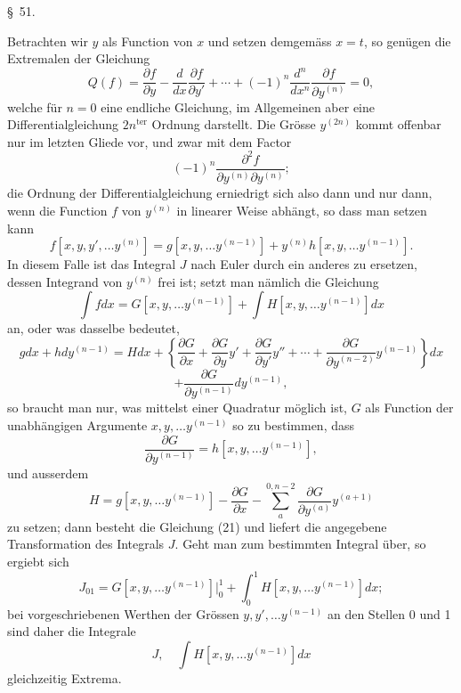 \documentclass[11pt,a4paper,leqno]{article}
\begin{document}
\begin{center}
{\large \S~51.}
\end{center}

Betrachten wir $y$ als Function von $x$ und setzen demgemäss $x=t$, so genügen die Extremalen der Gleichung
\begin{equation}\tag{20}
Q(f)=\frac{\partial f}{\partial y}-\frac{d}{dx}\frac{\partial f}{\partial y'}+\cdots+(-1)^n\frac{d^n}{dx^n}\frac{\partial f}{\partial y^{(n)}}=0,
\end{equation}
welche für $n=0$ eine endliche Gleichung, im Allgemeinen aber eine Differentialgleichung $2n^{\mathrm{ter}}$ Ordnung darstellt. Die Grösse $y^{(2n)}$ kommt offenbar nur im letzten Gliede vor, und zwar mit dem Factor
\[
(-1)^n\frac{\partial^2f}{\partial y^{(n)}\partial y^{(n)}};
\]
die Ordnung der Differentialgleichung erniedrigt sich also dann und nur dann, wenn die Function $f$ von $y^{(n)}$ in linearer Weise abhängt, so dass man setzen kann
\[
f[x,y,y',\ldots y^{(n)}]=g[x,y,\ldots y^{(n-1)}]+y^{(n)}h[x,y,\ldots y^{(n-1)}].
\]
In diesem Falle ist das Integral $J$ nach Euler durch ein anderes zu ersetzen, dessen Integrand von $y^{(n)}$ frei ist; setzt man nämlich die Gleichung
\begin{equation}\tag{21}
\int fdx=G[x,y,\ldots y^{(n-1)}]+\int H[x,y,\ldots y^{(n-1)}]dx
\end{equation}
an, oder was dasselbe bedeutet,
\[
gdx+hdy^{(n-1)}=Hdx
+\left\{\frac{\partial G}{\partial x}+\frac{\partial G}{\partial y}y'+\frac{\partial G}{\partial y'}y''+\cdots+\frac{\partial G}{\partial y^{(n-2)}}y^{(n-1)}\right\}dx
\]
\[
+\frac{\partial G}{\partial y^{(n-1)}}dy^{(n-1)},
\]
so braucht man nur, was mittelst einer Quadratur möglich ist, $G$ als Function der unabhängigen Argumente $x,y,\ldots y^{(n-1)}$ so zu bestimmen, dass
\[
\frac{\partial G}{\partial y^{(n-1)}}=h[x,y,\ldots y^{(n-1)}],
\]
und ausserdem
\[
H=g[x,y,\ldots y^{(n-1)}]-\frac{\partial G}{\partial x}-\sum_a^{0,n-2}\frac{\partial G}{\partial y^{(a)}}y^{(a+1)}
\]
zu setzen; dann besteht die Gleichung (21) und liefert die angegebene Transformation des Integrals $J$. Geht man zum bestimmten Integral über, so ergiebt sich
\[
J_{01}=G[x,y,\ldots y^{(n-1)}]\bigg|_0^1+
\int_0^1H[x,y,\ldots y^{(n-1)}]dx;
\]
bei vorgeschriebenen Werthen der Grössen $y,y',\ldots y^{(n-1)}$ an den Stellen 0 und 1 sind daher die Integrale
\[
J,\quad \int H[x,y,\ldots y^{(n-1)}]dx
\]
gleichzeitig Extrema.
\end{document}
